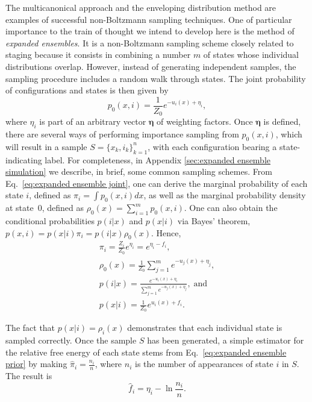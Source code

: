 \documentclass[aip,jcp,reprint,amsmath,amssymb]{revtex4-1}
\newcommand{\vt}[1]{\boldsymbol{\mathbf{#1}}}           %
\begin{document}
The multicanonical approach\cite{Berg_1992, Lee_1993, Abreu_2006} and the enveloping distribution method\cite{Christ_2007, *Christ_2008, *Christ_2009} are examples of successful non-Boltzmann sampling techniques. One of particular importance to the train of thought we intend to develop here is the method of \textit{expanded ensembles}.\cite{Lyubartsev_1992} It is a non-Boltzmann sampling scheme closely related to staging because it consists in combining a number $m$ of states whose individual distributions overlap. However, instead of generating independent samples, the sampling procedure includes a random walk through states. The joint probability of configurations and states is then given by\cite{Nymeyer_2010}
\begin{equation}
\label{eq:expanded ensemble joint}
p_0(x, i) = \frac{1}{Z_0} e^{-u_i(x) + \eta_i},
\end{equation}
where $\eta_i$ is part of an arbitrary vector $\vt \eta$ of weighting factors. Once $\vt \eta$ is defined, there are several ways of performing importance sampling from $p_0(x,i)$, which will result in a sample $S = \{x_k,i_k\}_{k=1}^n$, with each configuration bearing a state-indicating label. For completeness, in Appendix \ref{sec:expanded ensemble simulation} we describe, in brief, some common sampling schemes. From Eq.~\eqref{eq:expanded ensemble joint}, one can derive the marginal probability of each state $i$, defined as $\pi_i = \int p_0(x,i)dx$, as well as the marginal probability density at state~$0$, defined as $\rho_0(x) = \sum_{i=1}^m p_0(x,i)$. One can also obtain the conditional probabilities $p(i|x)$ and $p(x|i)$ via Bayes' theorem, $p(x,i) = p(x|i) \pi_i = p(i|x) \rho_0(x)$. Hence,
\begin{subequations}
\label{eq:expanded ensemble probabilities}
\begin{gather}
\pi_i = \frac{Z_i}{Z_0} e^{\eta_i} = e^{\eta_i - f_i}, \label{eq:expanded ensemble prior} \\
\rho_0(x) = \frac{1}{Z_0} \sum_{j=1}^m e^{-u_j(x) + \eta_j}, \label{eq:expanded ensemble evidence} \\
p(i|x) = \frac{e^{-u_i(x) + \eta_i}}{\sum_{j=1}^m e^{-u_j(x) + \eta_j}}, \; \text{and} \label{eq:expanded ensemble posterior} \\
p(x|i) = \frac{1}{Z_0} e^{u_i(x) + f_i}. \label{eq:expanded ensemble likelihood}
\end{gather}
\end{subequations}

The fact that $p(x|i) = \rho_i(x)$ demonstrates that each individual state is sampled correctly. Once the sample $S$ has been generated, a simple estimator for the relative free energy of each state stems from Eq.~\eqref{eq:expanded ensemble prior} by making $\hat \pi_i = \frac{n_i}{n}$, where $n_i$ is the number of appearances of state $i$ in $S$. The result is
\begin{equation}
\label{eq:expanded ensemble histogram estimator}
\hat f_i = \eta_i - \ln \frac{n_i}{n}.
\end{equation}
\end{document}
